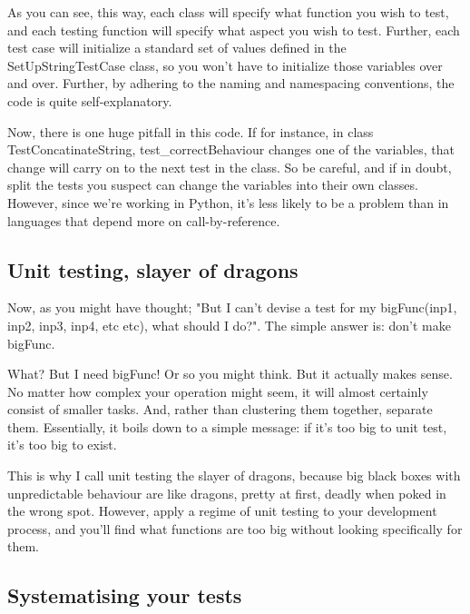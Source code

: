 \documentclass[10pt,a4paper]{article}
\begin{document}
As you can see, this way, each class will specify what function you wish to test, and each testing function will specify what aspect you wish to test. Further, each test case will initialize a standard set of values defined in the SetUpStringTestCase class, so you won't have to initialize those variables over and over. Further, by adhering to the naming and namespacing conventions, the code is quite self-explanatory.

Now, there is one huge pitfall in this code. If for instance, in class TestConcatinateString, test\_correctBehaviour changes one of the variables, that change will carry on to the next test in the class. So be careful, and if in doubt, split the tests you suspect can change the variables into their own classes. However, since we're working in Python, it's less likely to be a problem than in languages that depend more on call-by-reference.  


\subsection{Unit testing, slayer of dragons}
Now, as you might have thought; "But I can't devise a test for my bigFunc(inp1, inp2, inp3, inp4, etc etc), what should I do?". The simple answer is: don't make bigFunc.

What? But I need bigFunc! Or so you might think. But it actually makes sense. No matter how complex your operation might seem, it will almost certainly consist of smaller tasks. And, rather than clustering them together, separate them. Essentially, it boils down to a simple message: if it's too big to unit test, it's too big to exist.

This is why I call unit testing the slayer of dragons, because big black boxes with unpredictable behaviour are like dragons, pretty at first, deadly when poked in the wrong spot. However, apply a regime of unit testing to your development process, and you'll find what functions are too big without looking specifically for them.




\subsection{Systematising your tests}
\end{document}
